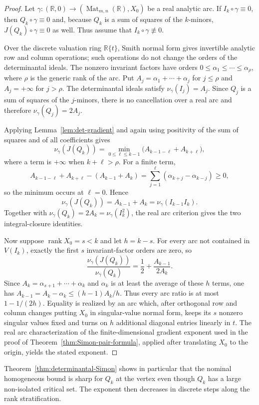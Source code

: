 \documentclass[11pt]{article}
\theoremstyle{definition}
\theoremstyle{remark}
\begin{document}
\begin{proof}
Let $\gamma:(\mathbb R,0)\to(\operatorname{Mat}_{m,n}(\mathbb R),X_0)$ be a real analytic arc. If $I_k\circ\gamma\equiv0$, then $Q_k\circ\gamma\equiv0$ and, because $Q_k$ is a sum of squares of the $k$-minors, $J(Q_k)\circ\gamma\equiv0$ as well. Thus assume that $I_k\circ\gamma\not\equiv0$.

Over the discrete valuation ring $\mathbb R\{t\}$, Smith normal form gives invertible analytic row and column operations; such operations do not change the orders of the determinantal ideals. The nonzero invariant factors have orders
$0\le\alpha_1\le\cdots\le\alpha_\rho$, where $\rho$ is the generic rank of the arc. Put $A_j=\alpha_1+\cdots+\alpha_j$ for $j\le\rho$ and $A_j=+\infty$ for $j>\rho$. The determinantal ideals satisfy $\nu_\gamma(I_j)=A_j$. Since $Q_j$ is a sum of squares of the $j$-minors, there is no cancellation over a real arc and therefore $\nu_\gamma(Q_j)=2A_j$.

Applying Lemma~\ref{lem:det-gradient} and again using positivity of the sum of squares and of all coefficients gives
$$
\nu_\gamma(J(Q_k))
=\min_{0\le\ell\le k-1}\bigl(A_{k-1-\ell}+A_{k+\ell}\bigr),
$$
where a term is $+\infty$ when $k+\ell>\rho$. For a finite term,
$$
A_{k-1-\ell}+A_{k+\ell}-(A_{k-1}+A_k)
=\sum_{j=1}^{\ell}(\alpha_{k+j}-\alpha_{k-j})\ge0,
$$
so the minimum occurs at $\ell=0$. Hence
$$
\nu_\gamma(J(Q_k))=A_{k-1}+A_k
=\nu_\gamma(I_{k-1}I_k).
$$
Together with $\nu_\gamma(Q_k)=2A_k=\nu_\gamma(I_k^2)$, the real arc criterion gives the two integral-closure identities.

Now suppose $\operatorname{rank}X_0=s<k$ and let $h=k-s$. For every arc not contained in $V(I_k)$, exactly the first $s$ invariant-factor orders are zero, so
$$
\frac{\nu_\gamma(J(Q_k))}{\nu_\gamma(Q_k)}
=\frac12+\frac{A_{k-1}}{2A_k}.
$$
Since $A_k=\alpha_{s+1}+\cdots+\alpha_k$ and $\alpha_k$ is at least the average of these $h$ terms, one has
$A_{k-1}=A_k-\alpha_k\le(h-1)A_k/h$. Thus every arc ratio is at most $1-1/(2h)$. Equality is realized by an arc which, after orthogonal row and column changes putting $X_0$ in singular-value normal form, keeps its $s$ nonzero singular values fixed and turns on $h$ additional diagonal entries linearly in $t$. The real arc characterization of the finite-dimensional gradient exponent used in the proof of Theorem~\ref{thm:Simon-pair-formula}, applied after translating $X_0$ to the origin, yields the stated exponent.
\end{proof}

Theorem~\ref{thm:determinantal-Simon} shows in particular that the nominal homogeneous bound is sharp for $Q_k$ at the vertex even though $Q_k$ has a large non-isolated critical set. The exponent then decreases in discrete steps along the rank stratification.
\end{document}

